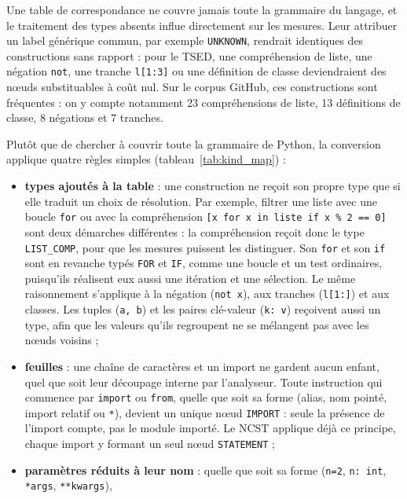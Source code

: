 \documentclass[12pt,a4paper,oneside]{report}
\begin{document}
Une table de correspondance ne couvre jamais toute la grammaire du
langage, et le traitement des types absents influe directement sur les
mesures. Leur attribuer un label générique commun, par exemple
\texttt{UNKNOWN}, rendrait identiques des constructions sans rapport : pour
le TSED, une compréhension de liste, une négation \texttt{not}, une tranche
\texttt{l[1:3]} ou une définition de classe deviendraient des nœuds
substituables à coût nul. Sur le corpus GitHub, ces constructions sont
fréquentes : on y compte notamment 23 compréhensions de liste, 13
définitions de classe, 8 négations et 7 tranches.

Plutôt que de chercher à couvrir toute la grammaire de Python, la conversion
applique quatre règles simples (tableau~\ref{tab:kind_map}) :
\begin{itemize}
  \item \textbf{types ajoutés à la table} : une construction ne reçoit son
        propre type que si elle traduit un choix de résolution. Par exemple,
        filtrer une liste avec une boucle \texttt{for} ou avec la
        compréhension \texttt{[x for x in liste if x \% 2 == 0]} sont deux
        démarches différentes : la compréhension reçoit donc le type
        \texttt{LIST\_COMP}, pour que les mesures puissent les distinguer.
        Son \texttt{for} et son \texttt{if} sont en revanche typés
        \texttt{FOR} et \texttt{IF}, comme une boucle et un test ordinaires,
        puisqu'ils réalisent eux aussi une itération et une sélection. Le
        même raisonnement s'applique à la négation (\texttt{not x}), aux
        tranches (\texttt{l[1:]}) et aux classes. Les tuples
        (\texttt{a, b}) et les paires clé-valeur (\texttt{k: v}) reçoivent
        aussi un type, afin que les valeurs qu'ils regroupent ne se mélangent
        pas avec les nœuds voisins ;
  \item \textbf{feuilles} : une chaîne de caractères et un import ne gardent
        aucun enfant, quel que soit leur découpage interne par l'analyseur.
        Toute instruction qui commence par \texttt{import} ou
        \texttt{from}, quelle que soit sa forme (alias, nom pointé, import
        relatif ou \texttt{*}), devient un unique nœud \texttt{IMPORT} : seule
        la présence de l'import compte, pas le module importé. Le NCST
        applique déjà ce principe, chaque import y formant un seul nœud
        \texttt{STATEMENT} ;
  \item \textbf{paramètres réduits à leur nom} : quelle que soit sa forme
        (\texttt{n=2}, \texttt{n: int}, \texttt{*args}, \texttt{**kwargs}),

\end{itemize}
\end{document}
